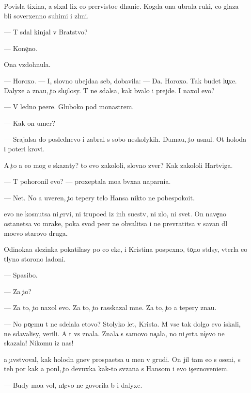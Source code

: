 \documentclass[10pt]{book}
\begin{document}
Povisla tixina, {\y}a sl{\yi}xal lix {\y}e{\y}o prer{\yi}visto{\y}e d{\yi}hani{\y}e. Kogda ona ubrala ruki, {\y}e{\y}o glaza b{\yi}li soverxenno suhimi i zl{\yi}mi.

— T{\yi} sdal kinjal v Bratstvo?

— Kone{\c}no.

Ona vzdohnula.

— Horoxo. — I, slovno ubejda{\y}a seb{\ia}, dobavila: — Da. Horoxo. Tak budet lu{\c}xe. Dalyxe {\y}a zna{\y}u, {\c}to slu{\c}ilosy. T{\yi} ne sdalsa, kak b{\yi}valo i prejde. I naxol {\y}evo?

— V led{\ia}no{\y} pe{\x}ere. Gluboko pod monast{\yi}rem.

— Kak on umer?

— Srajalsa do poslednevo i zabral s sobo{\y} neskolykih. Duma{\y}u, {\c}to usnul. Ot holoda i poteri krovi.

A {\c}to {\y}a {\y}e{\x}o mog {\y}e{\y} skazaty? {\C}to {\y}evo zakololi, slovno zver{\ia}? Kak zakololi Hartviga.

— T{\yi} pohoronil {\y}evo? — proxeptala mo{\y}a b{\yi}vxa{\y}a naparni{\q}a.

— Net. No {\y}a uveren, {\c}to tepery telo Hansa nikto ne pobespoko{\y}it.

{\Y}evo ne kosnutsa ni {\c}ervi, ni trupo{\y}ed{\yi} iz in{\yi}h su{\x}estv, ni zlo, ni svet. On nave{\c}no ostanetsa vo mrake, poka svod pe{\x}er{\yi} ne obvalitsa i ne prevratitsa v savan dl{\ia} mo{\y}evo starovo druga.

Odinoka{\y}a slezinka pokatilasy po {\y}e{\y}o {\x}eke, i Kristina pospexno, to{\c}no st{\yi}d{\ia}sy, v{\yi}terla {\y}e{\y}o t{\yi}lyno{\y} storono{\y} ladoni.

— Spasibo.

— Za {\c}to?

— Za to, {\c}to naxol {\y}evo. Za to, {\c}to rasskazal mne. Za to, {\c}to {\y}a tepery zna{\y}u.

— No po{\c}emu t{\yi} ne sdelala etovo? Stolyko let, Krista. M{\yi} vse tak dolgo {\y}evo iskali, ne sdavalisy, verili. A t{\yi} vs{\e} znala. Znala s samovo na{\c}ala, no ni {\c}erta ni{\c}evo ne skazala! Nikomu iz nas!

{\Y}a {\c}uvstvoval, kak holodn{\yi}{\y} gnev pros{\yi}pa{\y}etsa u men{\ia} v grudi. On jil tam {\y}e{\x}o s oseni, s teh por kak {\y}a pon{\ia}l, {\c}to devuxka kak-to sv{\ia}zana s Hansom i {\y}evo is{\c}eznoveni{\y}em.

— Budy mo{\y}a vol{\ia}, ni{\c}evo ne govorila b{\yi} i dalyxe.
\end{document}
